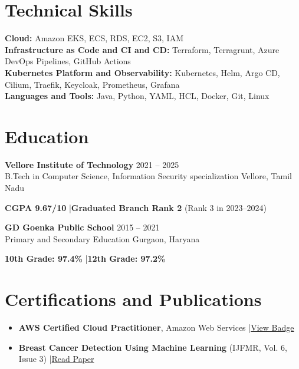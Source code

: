 \documentclass[letterpaper,10pt]{article}
\newcommand{\entry}[4]{%
  \noindent\textbf{#1} \hfill {\small #2}\\
  {\small #3} \hfill {\small #4}\par\vspace{2pt}%
}
\begin{document}
\section{Technical Skills}
\small
\textbf{Cloud:} Amazon EKS, ECS, RDS, EC2, S3, IAM\\
\textbf{Infrastructure as Code and CI and CD:} Terraform, Terragrunt, Azure DevOps Pipelines, GitHub Actions\\
\textbf{Kubernetes Platform and Observability:} Kubernetes, Helm, Argo CD, Cilium, Traefik, Keycloak, Prometheus, Grafana\\
\textbf{Languages and Tools:} Java, Python, YAML, HCL, Docker, Git, Linux
\normalsize

\section{Education}
\entry{Vellore Institute of Technology}{2021 -- 2025}{B.Tech in Computer Science, Information Security specialization}{Vellore, Tamil Nadu}
{\small \textbf{CGPA 9.67/10} \quad|\quad \textbf{Graduated Branch Rank 2} (Rank 3 in 2023--2024)}

\vspace{4pt}
\entry{GD Goenka Public School}{2015 -- 2021}{Primary and Secondary Education}{Gurgaon, Haryana}
{\small \textbf{10th Grade: 97.4\%} \quad|\quad \textbf{12th Grade: 97.2\%}}

\section{Certifications and Publications}
\small
\begin{itemize}
  \item \textbf{AWS Certified Cloud Practitioner}, Amazon Web Services \quad|\quad \href{https://www.credly.com/badges/e8c982dc-88f2-43ee-8bf6-e8e307488314}{View Badge}
  \item \textbf{Breast Cancer Detection Using Machine Learning} (IJFMR, Vol. 6, Issue 3) \quad|\quad \href{https://www.ijfmr.com/papers/2024/3/23223.pdf}{Read Paper}
\end{itemize}
\normalsize
\end{document}
